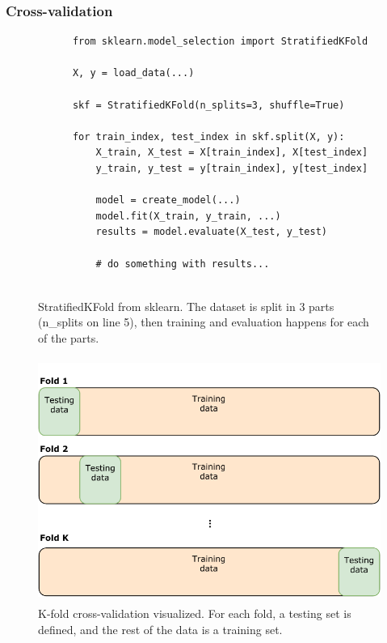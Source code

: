 \newpage

\subsubsection{Cross-validation}
\begin{figure}[h]
  \begin{code}    
      \begin{verbatim}
      from sklearn.model_selection import StratifiedKFold
  
      X, y = load_data(...)
  
      skf = StratifiedKFold(n_splits=3, shuffle=True)
  
      for train_index, test_index in skf.split(X, y):
          X_train, X_test = X[train_index], X[test_index]
          y_train, y_test = y[train_index], y[test_index]
  
          model = create_model(...)
          model.fit(X_train, y_train, ...)
          results = model.evaluate(X_test, y_test)
  
          # do something with results...
  
      \end{verbatim}
      \caption{StratifiedKFold from sklearn. The dataset is split in 3 parts (n\_splits on line 5), then training and evaluation happens for each of the parts.}
      \label{code:sklearn_k_fold}
  \end{code}
\end{figure}

\begin{figure}[!ht]
  \begin{center}
    \includegraphics[height=8cm]{img/Cross-validation.pdf}
    \caption{K-fold cross-validation visualized. For each fold, a testing set is defined, and the rest of the data is a training set.}
    \label{figure:dataset_cross_val}
  \end{center}  
\end{figure}

